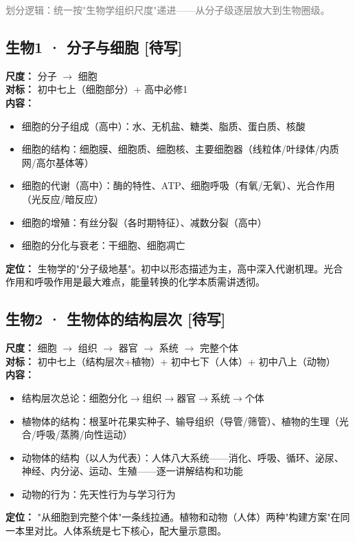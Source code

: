 \documentclass[a4paper,12pt]{ctexart}
\newcommand{\plan}{\textcolor{planblue}{\textbf{[待写]}}}
\begin{document}
\textcolor{gray}{划分逻辑：统一按"生物学组织尺度"递进——从分子级逐层放大到生物圈级。}

\subsection*{生物1 · 分子与细胞 \plan}

\textbf{尺度：} 分子 $\rightarrow$ 细胞\\
\textbf{对标：} 初中七上（细胞部分）+ 高中必修1\\
\textbf{内容：}
\begin{itemize}
  \item 细胞的分子组成（高中）：水、无机盐、糖类、脂质、蛋白质、核酸
  \item 细胞的结构：细胞膜、细胞质、细胞核、主要细胞器（线粒体/叶绿体/内质网/高尔基体等）
  \item 细胞的代谢（高中）：酶的特性、ATP、细胞呼吸（有氧/无氧）、光合作用（光反应/暗反应）
  \item 细胞的增殖：有丝分裂（各时期特征）、减数分裂（高中）
  \item 细胞的分化与衰老：干细胞、细胞凋亡
\end{itemize}
\textbf{定位：} 生物学的"分子级地基"。初中以形态描述为主，高中深入代谢机理。光合作用和呼吸作用是最大难点，能量转换的化学本质需讲透彻。

\subsection*{生物2 · 生物体的结构层次 \plan}

\textbf{尺度：} 细胞 $\rightarrow$ 组织 $\rightarrow$ 器官 $\rightarrow$ 系统 $\rightarrow$ 完整个体\\
\textbf{对标：} 初中七上（结构层次+植物）+ 初中七下（人体）+ 初中八上（动物）\\
\textbf{内容：}
\begin{itemize}
  \item 结构层次总论：细胞分化$\rightarrow$组织$\rightarrow$器官$\rightarrow$系统$\rightarrow$个体
  \item 植物体的结构：根茎叶花果实种子、输导组织（导管/筛管）、植物的生理（光合/呼吸/蒸腾/向性运动）
  \item 动物体的结构（以人为代表）：人体八大系统——消化、呼吸、循环、泌尿、神经、内分泌、运动、生殖——逐一讲解结构和功能
  \item 动物的行为：先天性行为与学习行为
\end{itemize}
\textbf{定位：} "从细胞到完整个体"一条线拉通。植物和动物（人体）两种"构建方案"在同一本里对比。人体系统是七下核心，配大量示意图。
\end{document}
